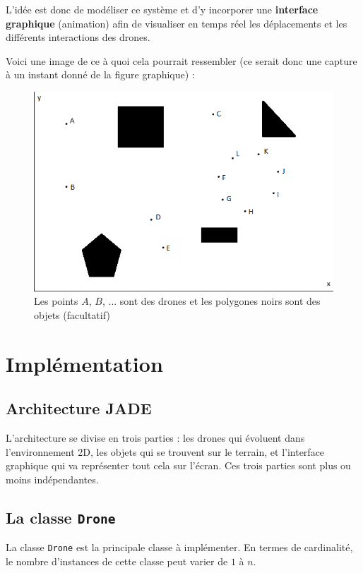 \documentclass[11pt]{report}
\begin{document}
L'idée est donc de modéliser ce système et d'y incorporer une \textbf{interface graphique} (animation) afin de visualiser en temps réel les déplacements et les différents interactions des drones.

Voici une image de ce à quoi cela pourrait ressembler (ce serait donc une capture à un instant donné de la figure graphique) : 

\begin{figure}[h]
\centering
\includegraphics{img/drones-graphique.png}
\caption{Les points $A$, $B$, ... sont des drones et les polygones noirs sont des objets (facultatif)}
\end{figure}

\clearpage
\section{Implémentation}
\subsection{Architecture JADE}

L'architecture se divise en trois parties : les drones qui évoluent dans l'environnement 2D, les objets qui se trouvent sur le terrain, et l'interface graphique qui va représenter tout cela sur l'écran. Ces trois parties sont plus ou moins indépendantes.

\subsection{La classe \protect\Verb+Drone+}

La classe \verb|Drone| est la principale classe à implémenter. En termes de cardinalité, le nombre d'instances de cette classe peut varier de $1$ à $n$.
\end{document}

